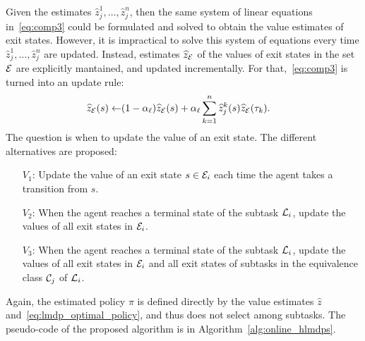 Given the estimates $\widehat{z}_j^1,\ldots,\widehat{z}_j^n$, then the same system of linear equations in~\eqref{eq:comp3} could be formulated and solved to obtain the value estimates of exit states. However, it is impractical to solve this system of equations every time %
$\widehat{z}_j^1,\ldots,\widehat{z}_j^n$ are updated. Instead, estimates $\widehat{z}_{\mathcal{E}}$ of the values of exit states in the set $\mathcal{E}$ are explicitly mantained, and updated incrementally. 
For that,~\eqref{eq:comp3} is turned into an update rule:
\begin{align}\label{eq:comprule}
\widehat{z}_{\mathcal{E}}(s) \leftarrow &(1 - \alpha_\ell) \widehat{z}_{\mathcal{E}}(s) + \alpha_\ell \sum_{k=1}^n \widehat{z}_j^k(s) \widehat{z}_{\mathcal{E}}(\tau_k).
\end{align}
The question is when to update the value of an exit state. The different alternatives are proposed:
\begin{itemize}
\item[$V_1$:] Update the value of an exit state $s\in\mathcal{E}_i$ each time the agent takes a transition from $s$.
\item[$V_2$:] When the agent reaches a terminal state of the subtask $\mathcal{L}_i$, update the values of all exit states in $\mathcal{E}_i$.
\item[$V_3$:] When the agent reaches a terminal state of the subtask $\mathcal{L}_i$, update the values of all exit states in $\mathcal{E}_i$ and all exit states of subtasks in the equivalence class $\mathcal{C}_j$ of $\mathcal{L}_i$.
\end{itemize}
Again, the estimated policy $\pi$ is defined directly by the value estimates $\widehat{z}$ and~\eqref{eq:lmdp_optimal_policy}, and thus does not select among subtasks. The pseudo-code of the proposed algorithm is in Algorithm~\ref{alg:online_hlmdps}.

